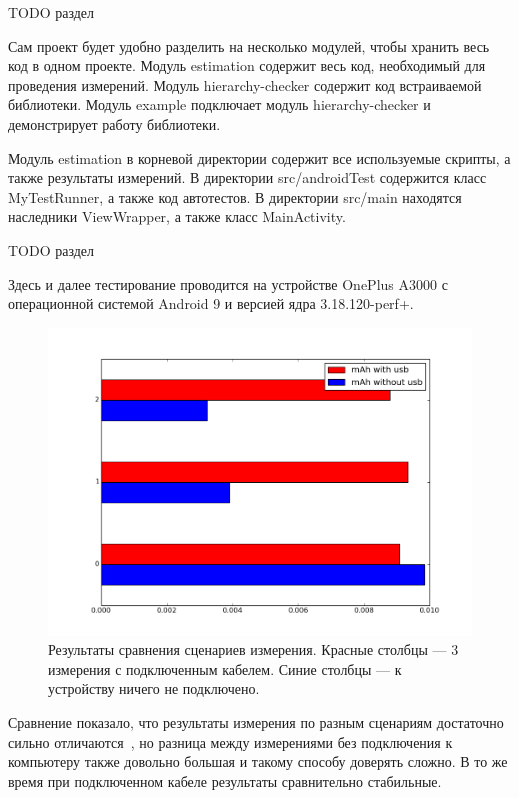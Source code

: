 \documentclass[a4paper,14pt]{extarticle} %
\begin{document}
	{\huge TODO раздел}
	
	Сам проект будет удобно разделить на несколько модулей, чтобы хранить весь код в одном проекте. Модуль estimation содержит весь код, необходимый для проведения измерений. Модуль hierarchy-checker содержит код встраиваемой библиотеки. Модуль example подключает модуль hierarchy-checker и демонстрирует работу библиотеки.
	
	Модуль estimation в корневой директории содержит все используемые скрипты, а также результаты измерений. В директории src/androidTest содержится класс MyTestRunner, а также код автотестов. В директории src/main находятся наследники ViewWrapper, а также класс MainActivity.
	
	{\huge TODO раздел}
	
	Здесь и далее тестирование проводится на устройстве OnePlus A3000 с операционной системой Android 9 и версией ядра 3.18.120-perf+.
	
	\begin{figure}[tbh]
		\includegraphics[width=\textwidth]{usb_comparation}
		\caption{Результаты сравнения  сценариев измерения. Красные столбцы --- 3 измерения с подключенным кабелем. Синие столбцы --- к устройству ничего не подключено.}
		\label{fig:usb_comparation}
	\end{figure}

	Сравнение показало, что результаты измерения по разным сценариям достаточно сильно отличаются~\ris{\ref{fig:usb_comparation}}, но разница между измерениями без подключения к компьютеру также довольно большая и такому способу доверять сложно. В то же время при подключенном кабеле результаты сравнительно стабильные.
	
\end{document}
